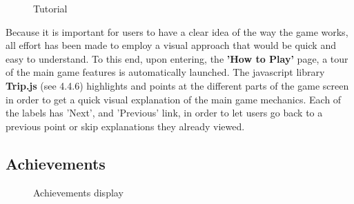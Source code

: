 \documentclass{mproj}
\begin{document}
\begin{figure} [h] 
	\centering
	\caption{Tutorial}
           \label{fig: tutorial}
\end{figure}

Because it is important for users to have a clear idea of the way the game works, all effort has been made to employ a visual approach that would be quick and easy to understand. To this end, upon entering, the \textbf{'How to Play'} page, a tour of the main game features is automatically launched. The javascript library \textbf{Trip.js} (see 4.4.6) highlights and points at the different parts of the game screen in order to get a quick visual explanation of the main game mechanics. Each of the labels has 'Next', and 'Previous' link, in order to let users go back to a previous point or skip explanations they already viewed.

\subsection{Achievements}

\begin{figure} [!hb] 
	\centering
	\caption{Achievements display}
           \label{fig: achievements}
\end{figure}
\end{document}
